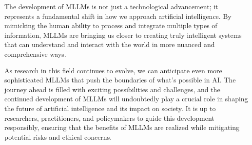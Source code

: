 The development of MLLMs is not just a technological advancement; it represents a fundamental shift in how we approach artificial intelligence. By mimicking the human ability to process and integrate multiple types of information, MLLMs are bringing us closer to creating truly intelligent systems that can understand and interact with the world in more nuanced and comprehensive ways.

As research in this field continues to evolve, we can anticipate even more sophisticated MLLMs that push the boundaries of what's possible in AI. The journey ahead is filled with exciting possibilities and challenges, and the continued development of MLLMs will undoubtedly play a crucial role in shaping the future of artificial intelligence and its impact on society. It is up to researchers, practitioners, and policymakers to guide this development responsibly, ensuring that the benefits of MLLMs are realized while mitigating potential risks and ethical concerns.
